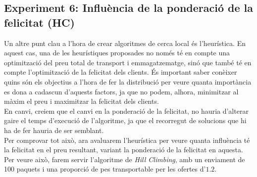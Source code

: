 \documentclass[a4paper]{article}
\begin{document}
\begin{table}[ht]
	\subsection{Experiment 6: Influència de la ponderació de la felicitat (HC)}
	
	Un altre punt clau a l'hora de crear algoritmes de cerca local és l'heurística. En aquest cas, una de les heurístiques proposades no només té en compte una optimització del preu total de transport i emmagatzematge, sinó que també té en compte l'optimització de la felicitat dels clients. És important saber conèixer quins són els objectius a l'hora de fer la distribució per veure quanta importància es dona a cadascun d'aquests factors, ja que no podem, alhora, minimitzar al màxim el preu i maximitzar la felicitat dels clients. \\
	
	En canvi, creiem que el canvi en la ponderació de la felicitat, no hauria d'alterar gaire el temps d'execució de l'algoritme, ja que el recorregut de solucions que hi ha de fer hauria de ser semblant. \\
	
	Per comprovar tot això, ara avaluarem l'heurística per veure quanta influència té la felicitat en el preu resultant, variant la ponderació de la felicitat en aquesta. Per veure això, farem servir l'algoritme de \textit{Hill Climbing}, amb un enviament de 100 paquets i una proporció de pes transportable per les ofertes d'$1.2$.
	

\end{table}
\end{document}
